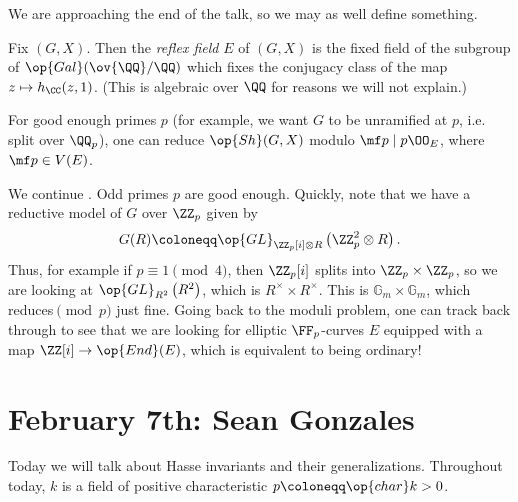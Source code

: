 \documentclass{article}
\begin{document}
We are approaching the end of the talk, so we may as well define something.
\begin{definition}
	Fix $(G,X)$. Then the \textit{reflex field} $E$ of $(G,X)$ is the fixed field of the subgroup of $\op{Gal}(\ov{\QQ}/\QQ)$ which fixes the conjugacy class of the map $z\mapsto h_\CC(z,1)$. (This is algebraic over $\QQ$ for reasons we will not explain.)
\end{definition}
For good enough primes $p$ (for example, we want $G$ to be unramified at $p$, i.e. split over $\QQ_p$), one can reduce $\op{Sh}(G,X)$ modulo $\mf p\mid p\OO_E$, where $\mf p\in V(E)$.
\begin{example}
	We continue . Odd primes $p$ are good enough. Quickly, note that we have a reductive model of $G$ over $\ZZ_p$ given by
	\[G(R)\coloneqq\op{GL}_{\ZZ_p[i]\otimes R}\left(\ZZ_p^2\otimes R\right).\]
	Thus, for example if $p\equiv1\pmod4$, then $\ZZ_p[i]$ splits into $\ZZ_p\times\ZZ_p$, so we are looking at $\op{GL}_{R^2}\left(R^2\right)$, which is $R^\times\times R^\times$. This is $\mathbb G_m\times\mathbb G_m$, which reduces$\pmod p$ just fine. Going back to the moduli problem, one can track back through to see that we are looking for elliptic $\FF_p$-curves $E$ equipped with a map $\ZZ[i]\to\op{End}(E)$, which is equivalent to being ordinary!
\end{example}

\section{February 7th: Sean Gonzales}
Today we will talk about Hasse invariants and their generalizations. Throughout today, $k$ is a field of positive characteristic $p\coloneqq\op{char}k>0$.
\end{document}
